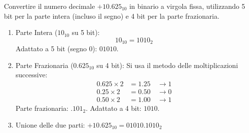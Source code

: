\begin{Exercise}[label={ex:virgola_fissa}]
    Convertire il numero decimale $+10.625_{10}$ in binario a virgola fissa, utilizzando 5 bit per la parte intera (incluso il segno) e 4 bit per la parte frazionaria.
\end{Exercise}

\begin{Answer}[ref={ex:virgola_fissa}]
    \begin{enumerate}
        \item Parte Intera ($10_{10}$ su 5 bit):
        $$10_{10} = 1010_2$$
        Adattato a 5 bit (segno $0$): $01010$.
        \item Parte Frazionaria ($0.625_{10}$ su 4 bit):
        Si usa il metodo delle moltiplicazioni successive:
        \begin{align*}
            0.625 \times 2 &= 1.25 \quad \to 1 \\
            0.25 \times 2 &= 0.50 \quad \to 0 \\
            0.50 \times 2 &= 1.00 \quad \to 1
        \end{align*}
        Parte frazionaria: $.101_2$. Adattato a 4 bit: $1010$.
        \item Unione delle due parti:
        $+10.625_{10} = 01010.1010_2$
    \end{enumerate}
\end{Answer}
